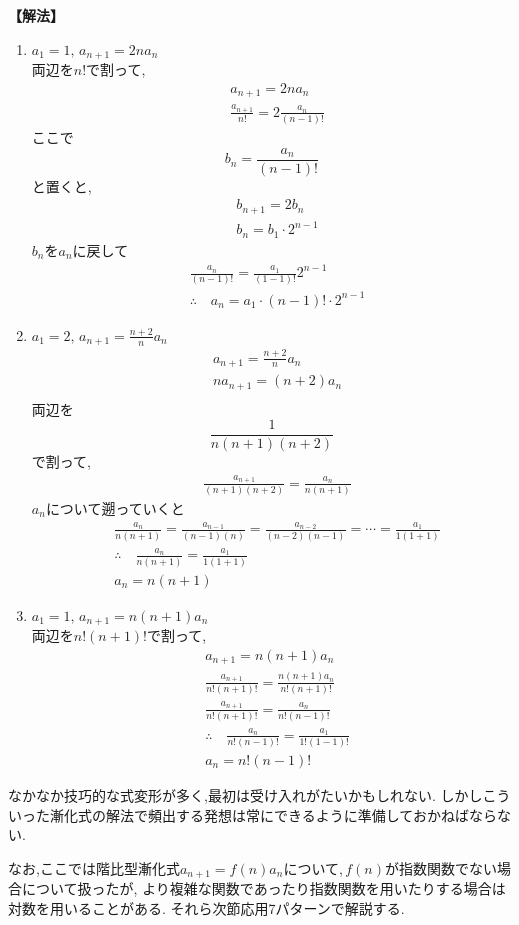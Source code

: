 \noindent\textbf{【解法】}
\begin{enumerate}[label=(\arabic*),parsep=3pt]
  \item $\displaystyle a_1=1,\, a_{n+1}=2na_n$\\
        両辺を$n!$で割って,
        \begin{align*}
           & a_{n+1}=2na_n                          \\
           & \frac{a_{n+1}}{n!}=2\frac{a_n}{(n-1)!}
        \end{align*}
        ここで
        \[
          b_n=\frac{a_n}{(n-1)!}
        \]
        と置くと,
        \begin{align*}
           & b_{n+1}=2b_n         \\
           & b_n=b_1\cdot 2^{n-1}
        \end{align*}
        $b_n$を$a_n$に戻して
        \begin{align*}
           & \frac{a_n}{(n-1)!}=\frac{a_1}{(1-1)!}2^{n-1}        \\
           & \therefore \quad a_n=a_1 \cdot (n-1)! \cdot 2^{n-1}
        \end{align*}

  \item $\displaystyle a_1=2,\, a_{n+1}=\frac{n+2}{n}a_n$
        \begin{align*}
           & a_{n+1}=\frac{n+2}{n}a_n \\
           & na_{n+1}=(n+2)a_n        \\
        \end{align*}
        両辺を
        \[
          \displaystyle \frac{1}{n(n+1)(n+2)}
        \]
        で割って,
        \begin{align*}
           & \frac{a_{n+1}}{(n+1)(n+2)}=\frac{a_{n}}{n(n+1)}
        \end{align*}
        $a_n$について遡っていくと
        \begin{align*}
           & \frac{a_{n}}{n(n+1)}=\frac{a_{n-1}}{(n-1)(n)}=\frac{a_{n-2}}{(n-2)(n-1)}=\cdots=\frac{a_{1}}{1(1+1)} \\
           & \therefore \quad \frac{a_{n}}{n(n+1)}=\frac{a_{1}}{1(1+1)}                                           \\
           & a_n=n(n+1)
        \end{align*}
  \item $\displaystyle a_1=1,\, a_{n+1}=n(n+1)a_n$\\
        両辺を$n!(n+1)!$で割って,
        \begin{align*}
           & a_{n+1}=n(n+1)a_n                                          \\
           & \frac{a_{n+1}}{n!(n+1)!}=\frac{n(n+1)a_n}{n!(n+1)!}        \\
           & \frac{a_{n+1}}{n!(n+1)!}=\frac{a_n}{n!(n-1)!}              \\
           & \therefore \quad \frac{a_n}{n!(n-1)!}=\frac{a_1}{1!(1-1)!} \\
           & a_n=n!(n-1)!
        \end{align*}
\end{enumerate}

なかなか技巧的な式変形が多く,最初は受け入れがたいかもしれない.
しかしこういった漸化式の解法で頻出する発想は常にできるように準備しておかねばならない.

なお,ここでは階比型漸化式$a_{n+1}=f(n)a_n$について,\,$f(n)$が指数関数でない場合について扱ったが,
より複雑な関数であったり指数関数を用いたりする場合は対数を用いることがある.
それら次節応用7パターンで解説する.
